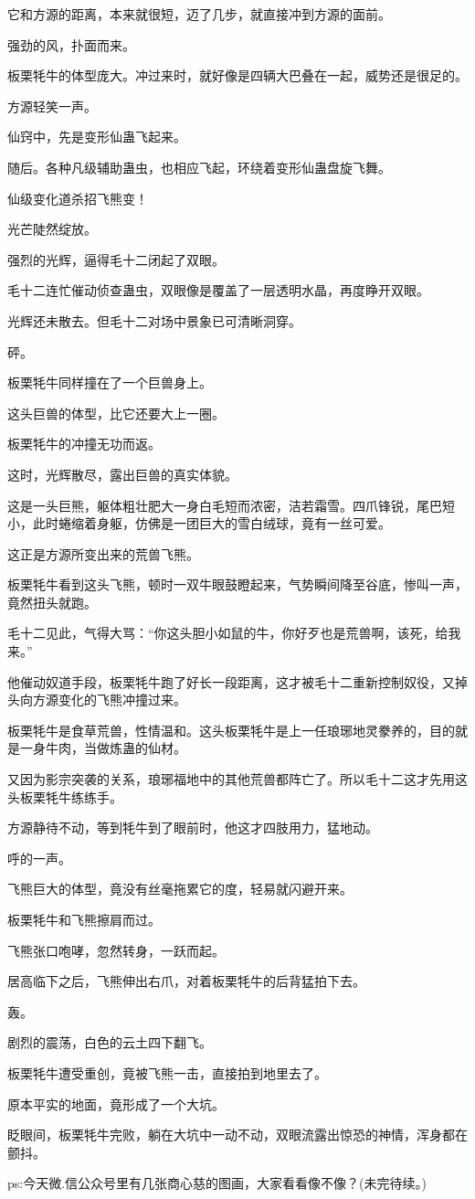 \begin{this_body}
它和方源的距离，本来就很短，迈了几步，就直接冲到方源的面前。

强劲的风，扑面而来。

板栗牦牛的体型庞大。冲过来时，就好像是四辆大巴叠在一起，威势还是很足的。

方源轻笑一声。

仙窍中，先是变形仙蛊飞起来。

随后。各种凡级辅助蛊虫，也相应飞起，环绕着变形仙蛊盘旋飞舞。

仙级变化道杀招飞熊变！

光芒陡然绽放。

强烈的光辉，逼得毛十二闭起了双眼。

毛十二连忙催动侦查蛊虫，双眼像是覆盖了一层透明水晶，再度睁开双眼。

光辉还未散去。但毛十二对场中景象已可清晰洞穿。

砰。

板栗牦牛同样撞在了一个巨兽身上。

这头巨兽的体型，比它还要大上一圈。

板栗牦牛的冲撞无功而返。

这时，光辉散尽，露出巨兽的真实体貌。

这是一头巨熊，躯体粗壮肥大一身白毛短而浓密，洁若霜雪。四爪锋锐，尾巴短小，此时蜷缩着身躯，仿佛是一团巨大的雪白绒球，竟有一丝可爱。

这正是方源所变出来的荒兽飞熊。

板栗牦牛看到这头飞熊，顿时一双牛眼鼓瞪起来，气势瞬间降至谷底，惨叫一声，竟然扭头就跑。

毛十二见此，气得大骂：“你这头胆小如鼠的牛，你好歹也是荒兽啊，该死，给我来。”

他催动奴道手段，板栗牦牛跑了好长一段距离，这才被毛十二重新控制奴役，又掉头向方源变化的飞熊冲撞过来。

板栗牦牛是食草荒兽，性情温和。这头板栗牦牛是上一任琅琊地灵豢养的，目的就是一身牛肉，当做炼蛊的仙材。

又因为影宗突袭的关系，琅琊福地中的其他荒兽都阵亡了。所以毛十二这才先用这头板栗牦牛练练手。

方源静待不动，等到牦牛到了眼前时，他这才四肢用力，猛地动。

呼的一声。

飞熊巨大的体型，竟没有丝毫拖累它的度，轻易就闪避开来。

板栗牦牛和飞熊擦肩而过。

飞熊张口咆哮，忽然转身，一跃而起。

居高临下之后，飞熊伸出右爪，对着板栗牦牛的后背猛拍下去。

轰。

剧烈的震荡，白色的云土四下翻飞。

板栗牦牛遭受重创，竟被飞熊一击，直接拍到地里去了。

原本平实的地面，竟形成了一个大坑。

眨眼间，板栗牦牛完败，躺在大坑中一动不动，双眼流露出惊恐的神情，浑身都在颤抖。

ps:今天微.信公众号里有几张商心慈的图画，大家看看像不像？(未完待续。)

\end{this_body}

